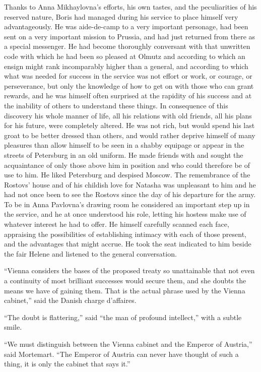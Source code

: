 Thanks to Anna Mikhaylovna's efforts, his own tastes, and the
peculiarities of his reserved nature, Boris had managed during
his service to place himself very advantageously. He was
aide-de-camp to a very important personage, had been sent on a
very important mission to Prussia, and had just returned from
there as a special messenger. He had become thoroughly conversant
with that unwritten code with which he had been so pleased at
Olmutz and according to which an ensign might rank incomparably
higher than a general, and according to which what was needed for
success in the service was not effort or work, or courage, or
perseverance, but only the knowledge of how to get on with those
who can grant rewards, and he was himself often surprised at the
rapidity of his success and at the inability of others to
understand these things. In consequence of this discovery his
whole manner of life, all his relations with old friends, all his
plans for his future, were completely altered. He was not rich,
but would spend his last groat to be better dressed than others,
and would rather deprive himself of many pleasures than allow
himself to be seen in a shabby equipage or appear in the streets
of Petersburg in an old uniform. He made friends with and sought
the acquaintance of only those above him in position and who
could therefore be of use to him. He liked Petersburg and
despised Moscow. The remembrance of the Rostovs' house and of his
childish love for Natasha was unpleasant to him and he had not
once been to see the Rostovs since the day of his departure for
the army. To be in Anna Pavlovna's drawing room he considered an
important step up in the service, and he at once understood his
role, letting his hostess make use of whatever interest he had to
offer. He himself carefully scanned each face, appraising the
possibilities of establishing intimacy with each of those
present, and the advantages that might accrue. He took the seat
indicated to him beside the fair Helene and listened to the
general conversation.

``Vienna considers the bases of the proposed treaty so
unattainable that not even a continuity of most brilliant
successes would secure them, and she doubts the means we have of
gaining them. That is the actual phrase used by the Vienna
cabinet,'' said the Danish charge d'affaires.

``The doubt is flattering,'' said ``the man of profound
intellect,'' with a subtle smile.

``We must distinguish between the Vienna cabinet and the Emperor
of Austria,'' said Mortemart. ``The Emperor of Austria can never
have thought of such a thing, it is only the cabinet that says
it.''

